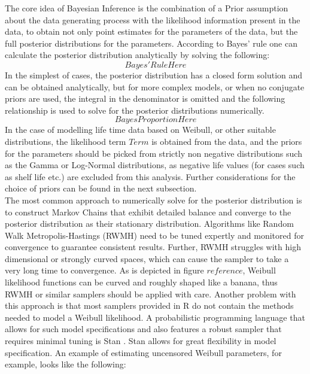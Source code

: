 The core idea of Bayesian Inference is the combination of a Prior assumption about the data generating process with the likelihood information present in the data, to obtain not only point estimates for the parameters of the data, but the full posterior distributions for the parameters. According to Bayes' rule one can calculate the posterior distribution analytically by solving the following: 
\begin{equation}
    Bayes' Rule Here
\end{equation}
In the simplest of cases, the posterior distribution has a closed form solution and can be obtained analytically, but for more complex models, or when no conjugate priors are used, the integral in the denominator is omitted and the following relationship is used to solve for the posterior distributions numerically. 
\begin{equation}
    Bayes Proportion Here
\end{equation}
In the case of modelling life time data based on Weibull, or other suitable distributions, the likelihood term $Term$ is obtained from the data, and the priors for the parameters should be picked from strictly non negative distributions such as the Gamma or Log-Normal distributions, as negative life values (for cases such as shelf life etc.) are excluded from this analysis. Further considerations for the choice of priors can be found in the next subsection. \\
The most common approach to numerically solve for the posterior distribution is to construct Markov Chains that exhibit detailed balance and converge to the posterior distribution as their stationary distribution. Algorithms like Random Walk Metropolis-Hastings (RWMH) need to be tuned expertly and monitored for convergence to guarantee consistent results. Further, RWMH struggles with high dimensional or strongly curved spaces, which can cause the sampler to take a very long time to convergence. As is depicted in figure $reference$, Weibull likelihood functions can be curved and roughly shaped like a banana, thus RWMH or similar samplers should be applied with care. Another problem with this approach is that most samplers provided in R do not contain the methods needed to model a Weibull likelihood. A probabilistic programming language that allows for such model specifications and also features a robust sampler that requires minimal tuning is Stan \cite{stan}. Stan allows for great flexibility in model specification. An example of estimating uncensored Weibull parameters, for example, looks like the following: 
